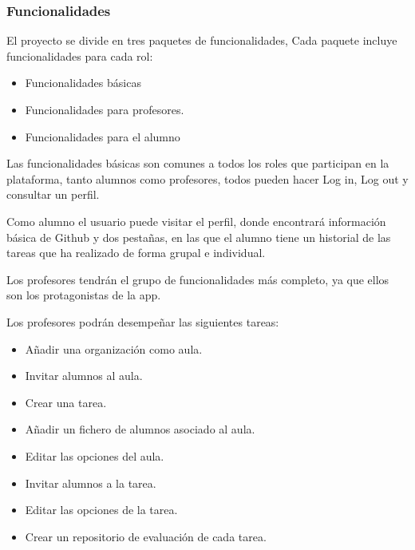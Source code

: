 \documentclass{beamer}
\begin{document}
\begin{frame}[allowframebreaks]
\frametitle{Funcionalidades}

  El proyecto se divide en tres paquetes de funcionalidades, Cada paquete incluye funcionalidades para cada rol:

  \begin{itemize}
    \item Funcionalidades básicas
    \item Funcionalidades para profesores.
    \item Funcionalidades para el alumno
  \end{itemize}

  \framebreak
  
  Las funcionalidades básicas son comunes a todos los roles que participan en la plataforma, 
  tanto alumnos como profesores, todos pueden hacer Log in, Log out y consultar un perfil.
  
  \bigskip
  
  Como alumno el usuario puede visitar el perfil, donde encontrará información básica de Github y dos pestañas, 
  en las que el alumno tiene un historial de las tareas que ha realizado de forma grupal e individual.
  
  \bigskip

  Los profesores tendrán el grupo de funcionalidades más completo, ya que ellos son los protagonistas 
  de la app.

  \framebreak

  Los profesores podrán desempeñar las siguientes tareas:

  \begin{itemize}
    \item Añadir una organización como aula.
    \item Invitar alumnos al aula.
    \item Crear una tarea.
    \item Añadir un fichero de alumnos asociado al aula.
    \item Editar las opciones del aula.
    \item Invitar alumnos a la tarea.
    \item Editar las opciones de la tarea.
    \item Crear un repositorio de evaluación de cada tarea.
  \end{itemize}

\end{frame}

  
\end{document}
